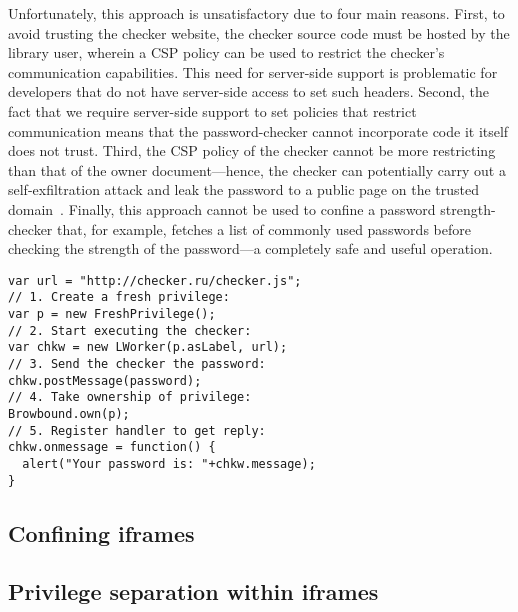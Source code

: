 Unfortunately, this approach is unsatisfactory due to four main reasons.
%
First, to avoid trusting the checker website, the checker source code
must be hosted by the library user, wherein a CSP policy can be used
to restrict the checker's communication capabilities. 
%
This need for server-side support is problematic for developers that
do not have server-side access to set such headers.
%
Second, the fact that we require server-side support to set policies
that restrict communication means that the password-checker cannot
incorporate code it itself does not trust.
%
Third, the CSP policy of the checker cannot be more restricting than
that of the owner document---hence, the checker can potentially carry
out a self-exfiltration attack and leak the password to a public page
on the trusted domain~.
%
Finally, this approach cannot be used to confine a password
strength-checker that, for example, fetches a list of commonly used
passwords before checking the strength of the password---a completely
safe and useful operation.

\begin{lstlisting}
var url = "http://checker.ru/checker.js";
// 1. Create a fresh privilege:
var p = new FreshPrivilege();
// 2. Start executing the checker:
var chkw = new LWorker(p.asLabel, url);
// 3. Send the checker the password:
chkw.postMessage(password);
// 4. Take ownership of privilege:
Browbound.own(p);
// 5. Register handler to get reply:
chkw.onmessage = function() {
  alert("Your password is: "+chkw.message);
}
\end{lstlisting}


\subsection{Confining iframes}
\label{sec:system:iframe}

\subsection{Privilege separation within iframes}
\label{sec:system:script}
